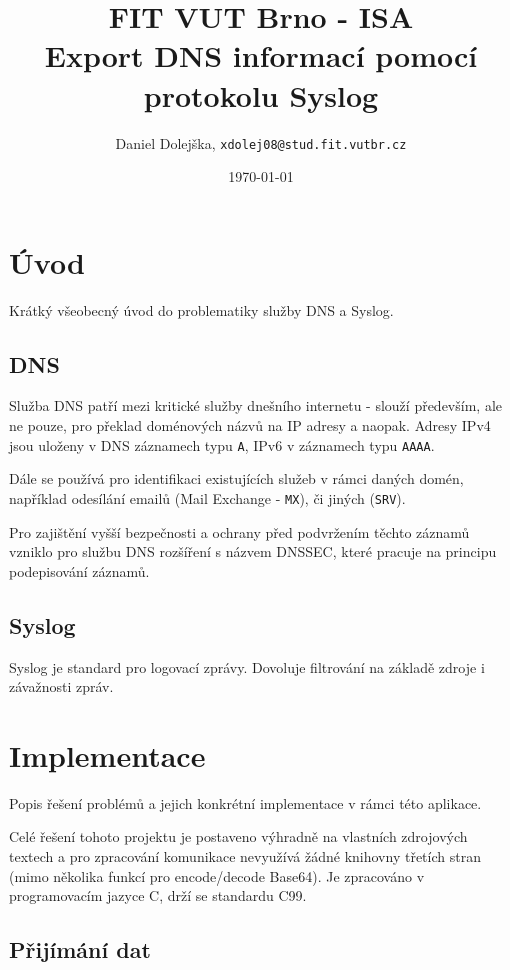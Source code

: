 \documentclass[11pt]{article}
\title{\textbf{FIT VUT Brno - ISA}\\
	Export DNS informací pomocí protokolu Syslog}
\author{Daniel Dolejška, \texttt{xdolej08@stud.fit.vutbr.cz}}
\date{\today}
\begin{document}
	
	\maketitle
	\tableofcontents
	
	
	\newpage
	
	\section{Úvod}
	Krátký všeobecný úvod do problematiky služby DNS a Syslog.
	
	\subsection{DNS}
	Služba DNS patří mezi kritické služby dnešního internetu - slouží především, ale ne pouze, pro překlad doménových názvů na IP adresy a naopak.
	Adresy IPv4 jsou uloženy v DNS záznamech typu \texttt{A}, IPv6 v záznamech typu \texttt{AAAA}\cite{RFC1035}.
	
	Dále se používá pro identifikaci existujících služeb v rámci daných domén, například odesílání emailů (Mail Exchange - \texttt{MX}), či jiných\cite{RFC2782} (\texttt{SRV}).
	
	Pro zajištění vyšší bezpečnosti a ochrany před podvržením těchto záznamů vzniklo pro službu DNS rozšíření s názvem DNSSEC, které pracuje na principu podepisování záznamů\cite{RFC4034}.
	
	\subsection{Syslog}
	Syslog je standard pro logovací zprávy\cite{RFC5424}.
	Dovoluje filtrování na základě zdroje i závažnosti zpráv.
	
	
	\section{Implementace}
	Popis řešení problémů a jejich konkrétní implementace v rámci této aplikace.
	
	Celé řešení tohoto projektu je postaveno výhradně na vlastních zdrojových textech a pro zpracování komunikace nevyužívá žádné knihovny třetích stran (mimo několika funkcí pro encode/decode Base64).
	Je zpracováno v programovacím jazyce C, drží se standardu C99.
	
	\subsection{Přijímání dat}
\end{document}
